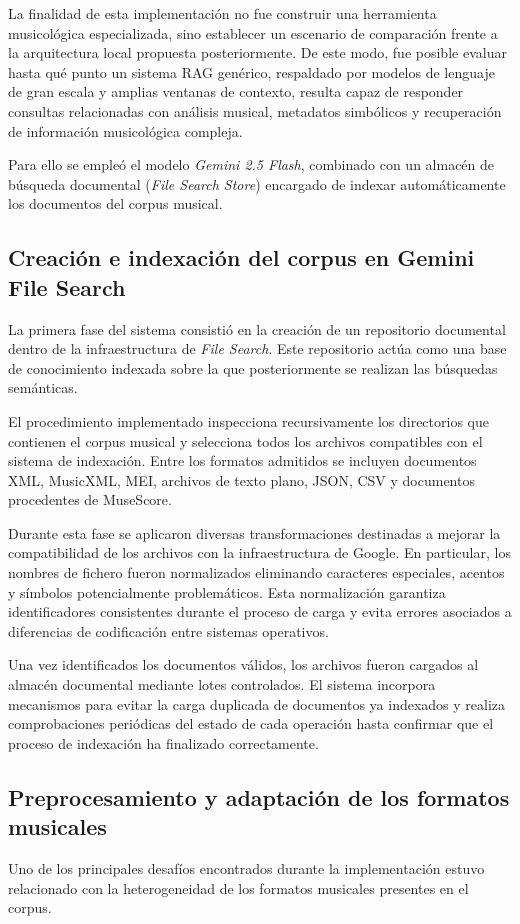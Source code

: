 La finalidad de esta implementación no fue construir una herramienta musicológica especializada, sino establecer un escenario de comparación frente a la arquitectura local propuesta posteriormente. De este modo, fue posible evaluar hasta qué punto un sistema RAG genérico, respaldado por modelos de lenguaje de gran escala y amplias ventanas de contexto, resulta capaz de responder consultas relacionadas con análisis musical, metadatos simbólicos y recuperación de información musicológica compleja.

Para ello se empleó el modelo \textit{Gemini 2.5 Flash}, combinado con un almacén de búsqueda documental (\textit{File Search Store}) encargado de indexar automáticamente los documentos del corpus musical.

\subsection{Creación e indexación del corpus en Gemini File Search}
La primera fase del sistema consistió en la creación de un repositorio documental dentro de la infraestructura de \textit{File Search}. Este repositorio actúa como una base de conocimiento indexada sobre la que posteriormente se realizan las búsquedas semánticas.

El procedimiento implementado inspecciona recursivamente los directorios que contienen el corpus musical y selecciona todos los archivos compatibles con el sistema de indexación. Entre los formatos admitidos se incluyen documentos XML, MusicXML, MEI, archivos de texto plano, JSON, CSV y documentos procedentes de MuseScore.

Durante esta fase se aplicaron diversas transformaciones destinadas a mejorar la compatibilidad de los archivos con la infraestructura de Google. En particular, los nombres de fichero fueron normalizados eliminando caracteres especiales, acentos y símbolos potencialmente problemáticos. Esta normalización garantiza identificadores consistentes durante el proceso de carga y evita errores asociados a diferencias de codificación entre sistemas operativos.

Una vez identificados los documentos válidos, los archivos fueron cargados al almacén documental mediante lotes controlados. El sistema incorpora mecanismos para evitar la carga duplicada de documentos ya indexados y realiza comprobaciones periódicas del estado de cada operación hasta confirmar que el proceso de indexación ha finalizado correctamente.

\subsection{Preprocesamiento y adaptación de los formatos musicales}
Uno de los principales desafíos encontrados durante la implementación estuvo relacionado con la heterogeneidad de los formatos musicales presentes en el corpus.

